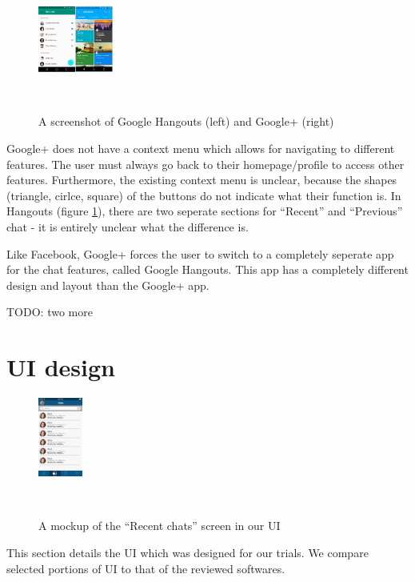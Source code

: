 \documentclass{sigchi}
\begin{document}
\begin{figure}
  \centering\includegraphics[width=0.22\textwidth]{figures/google_plus}
  \caption{A screenshot of Google Hangouts (left) and Google+ (right)}~\label{fig:google_plus}
\end{figure}

Google+ does not have a context menu which allows for navigating to different
features. The user must always go back to their homepage/profile to access other
features. Furthermore, the existing context menu is unclear, because the shapes
(triangle, cirlce, square) of the buttons do not indicate what their function
is. In Hangouts (figure \ref{fig:google_plus}), there are two seperate sections
for ``Recent'' and ``Previous'' chat - it is entirely unclear what the
difference is. 

Like Facebook, Google+ forces the user to switch to a completely seperate app
for the chat features, called Google Hangouts. This app has a completely
different design and layout than the Google+ app. 

{\color{red} TODO: two more}

\section{UI design}\label{sec:UI}

\begin{figure}%
  \vspace{-33pt}
  \centering\includegraphics[width=0.13\textwidth]{figures/Chats_EDIT}
  \caption{A mockup of the ``Recent chats'' screen in our UI}~\label{fig:UIchats}
\end{figure}%

This section details the UI which was designed for our trials. We compare 
selected portions of UI to that of the reviewed softwares. 
\end{document}
